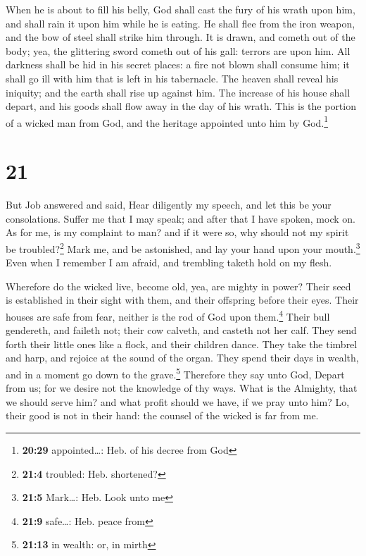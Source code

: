  When he is about to fill his belly, God shall cast the
fury of his wrath upon him, and shall rain it upon him while he is
eating.  He shall flee from the iron weapon, and the bow
of steel shall strike him through.  It is drawn, and
cometh out of the body; yea, the glittering sword cometh out of his
gall: terrors are upon him.  All darkness shall be hid in
his secret places: a fire not blown shall consume him; it shall go ill
with him that is left in his tabernacle.  The heaven
shall reveal his iniquity; and the earth shall rise up against him.
 The increase of his house shall depart, and his goods
shall flow away in the day of his wrath.  This is the
portion of a wicked man from God, and the heritage appointed unto him by
God.\footnote{\textbf{20:29} appointed\ldots: Heb. of his decree from
  God}

\hypertarget{section-20}{%
\section{21}\label{section-20}}

 But Job answered and said,  Hear diligently
my speech, and let this be your consolations.  Suffer me
that I may speak; and after that I have spoken, mock on. 
As for me, is my complaint to man? and if it were so, why should not my
spirit be troubled?\footnote{\textbf{21:4} troubled: Heb. shortened?}
 Mark me, and be astonished, and lay your hand upon your
mouth.\footnote{\textbf{21:5} Mark\ldots: Heb. Look unto me}
 Even when I remember I am afraid, and trembling taketh
hold on my flesh.

 Wherefore do the wicked live, become old, yea, are mighty
in power?  Their seed is established in their sight with
them, and their offspring before their eyes.  Their houses
are safe from fear, neither is the rod of God upon them.\footnote{\textbf{21:9}
  safe\ldots: Heb. peace from}  Their bull gendereth, and
faileth not; their cow calveth, and casteth not her calf.
 They send forth their little ones like a flock, and
their children dance.  They take the timbrel and harp,
and rejoice at the sound of the organ.  They spend their
days in wealth, and in a moment go down to the grave.\footnote{\textbf{21:13}
  in wealth: or, in mirth}  Therefore they say unto God,
Depart from us; for we desire not the knowledge of thy ways.
 What is the Almighty, that we should serve him? and what
profit should we have, if we pray unto him?  Lo, their
good is not in their hand: the counsel of the wicked is far from me.

